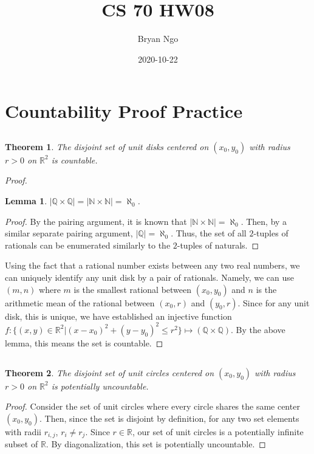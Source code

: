 \documentclass{article}
\title{CS 70 HW08}
\author{Bryan Ngo}
\date{2020-10-22}
\newtheorem{theorem}{Theorem}
\newtheorem{lemma}{Lemma}
\newcommand{\N}{\mathbb{N}}
\newcommand{\Q}{\mathbb{Q}}
\newcommand{\R}{\mathbb{R}}
\begin{document}
\maketitle

\section{Countability Proof Practice}

\subsection{}

\begin{theorem}
    The disjoint set of unit disks centered on \((x_0, y_0)\) with radius \(r > 0\) on \(\R^2\) is countable.
\end{theorem}
\begin{proof}
    \begin{lemma}
        \(|\Q \times \Q| = |\N \times \N| = \aleph_0\).
    \end{lemma}
    \begin{proof}
        By the pairing argument, it is known that \(|\N \times \N| = \aleph_0\).
        Then, by a similar separate pairing argument, \(|\Q| = \aleph_0\).
        Thus, the set of all \(2\)-tuples of rationals can be enumerated similarly to the \(2\)-tuples of naturals.
    \end{proof}
    Using the fact that a rational number exists between any two real numbers, we can uniquely identify any unit disk by a pair of rationals.
    Namely, we can use \((m, n)\) where \(m\) is the smallest rational between \((x_0, y_0)\) and \(n\) is the arithmetic mean of the rational between \((x_0, r)\) and \((y_0, r)\).
    Since for any unit disk, this is unique, we have established an injective function \(f: \{(x, y) \in \R^2 | (x - x_0)^2 + (y - y_0)^2 \leqslant r^2\} \mapsto (\Q \times \Q)\).
    By the above lemma, this means the set is countable.
\end{proof}

\subsection{}

\begin{theorem}
    The disjoint set of unit circles centered on \((x_0, y_0)\) with radius \(r > 0\) on \(\R^2\) is potentially uncountable.
\end{theorem}
\begin{proof}
    Consider the set of unit circles where every circle shares the same center \((x_0, y_0)\).
    Then, since the set is disjoint by definition, for any two set elements with radii \(r_{i, j}\), \(r_i \neq r_j\).
    Since \(r \in \R\), our set of unit circles is a potentially infinite subset of \(\R\).
    By diagonalization, this set is potentially uncountable.
\end{proof}
\end{document}
